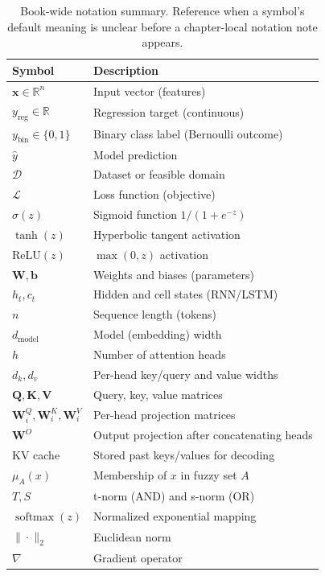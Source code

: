 \begingroup
\small
\setlength{\tabcolsep}{4pt}
\renewcommand{\arraystretch}{0.92}
\begin{table}[h]
\centering
\caption{Book-wide notation summary. Reference when a symbol's default meaning is unclear before a chapter-local notation note appears.}
\begin{tabular}{@{}ll@{}}
\toprule
\textbf{Symbol} & \textbf{Description} \\
\midrule
$\mathbf{x} \in \mathbb{R}^n$ & Input vector (features) \\
$y_{\text{reg}} \in \mathbb{R}$ & Regression target (continuous) \\
$y_{\text{bin}} \in \{0,1\}$ & Binary class label (Bernoulli outcome) \\
$\hat{y}$ & Model prediction \\
$\mathcal{D}$ & Dataset or feasible domain \\
$\mathcal{L}$ & Loss function (objective) \\
$\sigma(z)$ & Sigmoid function $1/(1+e^{-z})$ \\
$\tanh(z)$ & Hyperbolic tangent activation \\
$\mathrm{ReLU}(z)$ & $\max(0, z)$ activation \\
$\mathbf{W}, \mathbf{b}$ & Weights and biases (parameters) \\
$h_t, c_t$ & Hidden and cell states (RNN/LSTM) \\
$n$ & Sequence length (tokens) \\
$d_{\text{model}}$ & Model (embedding) width \\
$h$ & Number of attention heads \\
$d_k, d_v$ & Per-head key/query and value widths \\
$\mathbf{Q},\mathbf{K},\mathbf{V}$ & Query, key, value matrices \\
$\mathbf{W}_i^Q,\mathbf{W}_i^K,\mathbf{W}_i^V$ & Per-head projection matrices \\
$\mathbf{W}^O$ & Output projection after concatenating heads \\
$\mathrm{KV}$ cache & Stored past keys/values for decoding \\
$\mu_A(x)$ & Membership of $x$ in fuzzy set $A$ \\
$T, S$ & t\hyp{}norm (AND) and s\hyp{}norm (OR) \\
$\operatorname{softmax}(z)$ & Normalized exponential mapping \\
$\|\cdot\|_2$ & Euclidean norm \\
$\nabla$ & Gradient operator \\

\end{tabular}
\end{table}
